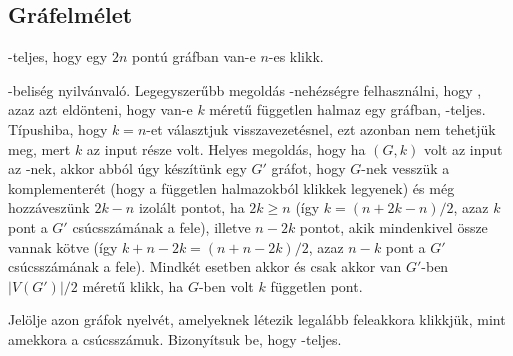 \subsection{Gr\'afelm\'elet}

\begin{Exercise}[counter={sorszam}, difficulty=0]
	\NP-teljes, hogy egy $2n$ pont\'u gr\'afban van-e $n$-es klikk.
\end{Exercise}	
\begin{Answer}
	\NP-belis\'eg nyilv\'anval\'o.
	Legegyszer\H ubb megold\'as \NP-neh\'ezs\'egre felhaszn\'alni, hogy , azaz azt eld\"onteni, hogy van-e $k$ m\'eret\H u f\"uggetlen halmaz egy gr\'afban, \NP-teljes. T\'ipushiba, hogy $k=n$-et v\'alasztjuk visszavezet\'esnel, ezt azonban nem tehetj\"uk meg, mert $k$ az input r\'esze volt. Helyes megold\'as, hogy ha $(G,k)$ volt az input az -nek, akkor abb\'ol \'ugy k\'esz\'it\"unk egy $G'$ gr\'afot, hogy $G$-nek vessz\"uk a komplementer\'et (hogy a f\"uggetlen halmazokb\'ol klikkek legyenek) \'es m\'eg hozz\'avesz\"unk $2k-n$ izol\'alt pontot, ha $2k\ge n$ (\'igy $k=(n+2k-n)/2$, azaz $k$ pont a $G'$ cs\'ucssz\'am\'anak a fele), illetve $n-2k$ pontot, akik mindenkivel \"ossze vannak k\"otve (\'igy $k+n-2k=(n+n-2k)/2$, azaz $n-k$ pont a $G'$ cs\'ucssz\'am\'anak a fele). Mindk\'et esetben akkor \'es csak akkor van $G'$-ben $|V(G')|/2$ m\'eret\H u klikk, ha $G$-ben volt $k$ f\"uggetlen pont.
\end{Answer}

\begin{Exercise}[counter={sorszam}, difficulty=0]
	Jelölje  azon gráfok nyelvét, amelyeknek létezik legalább feleakkora klikkjük, mint amekkora
	a csúcsszámuk. Bizonyítsuk be, hogy  \NP-teljes.
\end{Exercise}


